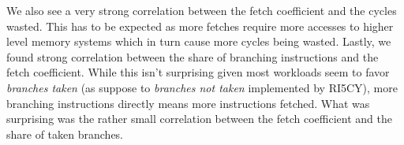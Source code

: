 \documentclass[../bachelor_paper.tex]{subfiles}
\begin{document}
We also see a very strong correlation between the fetch coefficient and the cycles wasted. This has to be expected as more fetches require more accesses to higher level memory systems which in turn cause more cycles being wasted. Lastly, we found strong correlation between the share of branching instructions and the fetch coefficient. While this isn't surprising given most workloads seem to favor \emph{branches taken} (as suppose to \emph{branches not taken} implemented by RI5CY), more branching instructions directly means more instructions fetched. What was surprising was the rather small correlation between the fetch coefficient and the share of taken branches.

\begin{table}
    \centering
    \caption{Pearson's correlation coefficient between metrics}
    \label{tab:res/corr/coeff}
\end{table}

\isstandalone



\fi
\end{document}
